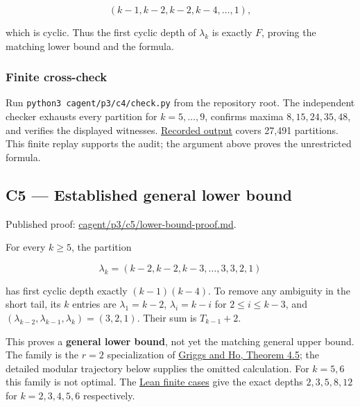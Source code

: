 \documentclass[11pt,a4paper]{article}
\begin{document}
\[
(k-1,k-2,k-2,k-4,\ldots,1),
\]

which is cyclic. Thus the first cyclic depth of \(\lambda_k\) is exactly \(F\), proving the matching lower bound and the formula.

\subsubsection{Finite cross-check}\label{finite-cross-check}

Run \texttt{python3\ cagent/p3/c4/check.py} from the repository root. The independent checker exhausts every partition for \(k=5,\ldots,9\), confirms maxima \(8,15,24,35,48\), and verifies the displayed witnesses. \href{https://github.com/mpelteshki/climbing-to-the-frontier/blob/212bba53b1818c08c40b8c4b48f636651eaf6410/cagent/p3/c4/finite-check.json}{Recorded output} covers 27,491 partitions. This finite replay supports the audit; the argument above proves the unrestricted formula.

\subsection{C5 --- Established general lower bound}\label{c5-established-general-lower-bound}

Published proof: \href{https://github.com/mpelteshki/climbing-to-the-frontier/blob/212bba53b1818c08c40b8c4b48f636651eaf6410/cagent/p3/c5/lower-bound-proof.md}{cagent/p3/c5/lower-bound-proof.md}.

For every \(k\ge5\), the partition

\[
\lambda_k=(k-2,k-2,k-3,\ldots,3,3,2,1)
\]

has first cyclic depth exactly \((k-1)(k-4)\). To remove any ambiguity in the short tail, its \(k\) entries are \(\lambda_1=k-2\), \(\lambda_i=k-i\) for \(2\le i\le k-3\), and \((\lambda_{k-2},\lambda_{k-1},\lambda_k)=(3,2,1)\). Their sum is \(T_{k-1}+2\).

This proves a \textbf{general lower bound}, not yet the matching general upper bound. The family is the \(r=2\) specialization of \href{https://sc.edu/study/colleges_schools/artsandsciences/mathematics/research/imi/research/documents/1998/1998_12.pdf}{Griggs and Ho, Theorem 4.5}; the detailed modular trajectory below supplies the omitted calculation. For \(k=5,6\) this family is not optimal. The \href{https://github.com/mpelteshki/climbing-to-the-frontier/blob/212bba53b1818c08c40b8c4b48f636651eaf6410/cagent/p3/c5/README.md}{Lean finite cases} give the exact depths \(2,3,5,8,12\) for \(k=2,3,4,5,6\) respectively.
\end{document}
